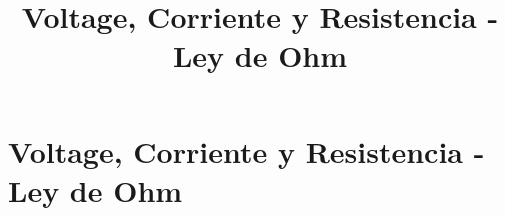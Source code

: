 \documentclass[output=paper, 
colorlinks,
citecolor=brown,
newtxmath
]{langscibook}
\author{}
\title{Voltage, Corriente y Resistencia - Ley de Ohm}
\begin{document}

\chapterfont{\Large\color{LightBlue}} 

\setcounter{chapter}{-1}
\chapter*{Voltage, Corriente y Resistencia - Ley de Ohm} 

\begingroup
\let\clearpage\relax
\cleardoublepage
\hypersetup{linkcolor=blue}
\tableofcontents
\let\clearpage\relax
\cleardoublepage
\endgroup



{\def\addcontentsline#1#2#3{}\maketitle}


\setcounter{page}{1}



\end{document}
